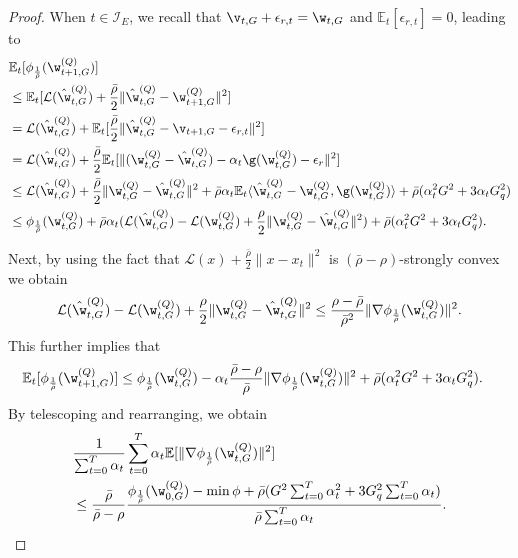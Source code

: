 \documentclass[a4paper,11pt]{article}
\begin{document}
\begin{proof}
When $t \in \mathcal{I}_E$, we recall that $\v_{t, G} + \epsilon_{r, t} = \w_{t, G} $ and $\mathbb{E}_t[\epsilon_{r, t}] = 0$, leading to
\begin{align*}
    & \mathbb{E}_t [\phi_{\frac{1}{\bar{\rho}}}(\w^{(Q)}_{t+1, G})]\\
    & \leq \mathbb{E}_t [\mathcal{L}(\hat{\w}^{(Q)}_{t, G}) + \frac{\bar{\rho}}{2}\|\hat{\w }^{(Q)}_{t, G} - \w^{(Q)}_{t+1, G} \|^2  ] \\
    & = \mathcal{L}(\hat{\w }^{(Q)}_{t, G}) + \mathbb{E}_t[ \frac{\bar{\rho}}{2}\|\hat{\w}^{(Q)}_{t, G} - \v_{t+1, G} - \epsilon_{r, t} \|^2 ] \\
    & = \mathcal{L}(\hat{\w }^{(Q)}_{t, G}) + \frac{\bar{\rho}}{2}\mathbb{E}_t [\| (\w^{(Q)}_{t, G} - \hat{\w }^{(Q)}_{t, G}) -  \alpha_{t} \g(\w^{(Q)}_{t, G}) - \epsilon_{r} \|^2 ] \\
    & \leq \mathcal{L}(\hat{\w}^{(Q)}_{t, G}) + \frac{\bar{\rho}}{2} \| \w^{(Q)}_{t, G} - \hat{\w }^{(Q)}_{t, G}\|^2 + \bar{\rho} \alpha_t \mathbb{E}_t\langle \hat{\w }^{(Q)}_{t, G} - \w^{(Q)}_{t, G}, \g(\w^{(Q)}_{t, G}) \rangle + \bar{\rho}(\alpha_t^2G^2+3\alpha_t G_q^2) \\
    & \leq  \phi_{\frac{1}{\bar{\rho}}}(\w^{(Q)}_{t, G}) + \bar{\rho}\alpha_t (\mathcal{L}(\hat{\w}^{(Q)}_{t, G} ) - \mathcal{L}(\w^{(Q)}_{t, G}) + \frac{\rho}{2} \|\w^{(Q)}_{t, G} - \hat{\w }^{(Q)}_{t, G} \|^2 ) + \bar{\rho}(\alpha_t^2G^2+3\alpha_t G_q^2).
\end{align*}

Next, by using the fact that $\mathcal{L}(x) + \frac{\bar{\rho}}{2} \|x - x_t \|^2$ is $(\bar{\rho} - \rho)$-strongly convex we obtain 
\begin{align*}
    \mathcal{L}(\hat{\w}^{(Q)}_{t, G} ) - \mathcal{L}(\w^{(Q)}_{t, G}) + \frac{\rho}{2} \|\w^{(Q)}_{t, G} - \hat{\w }^{(Q)}_{t, G} \|^2 \leq \frac{\rho - \bar{\rho}}{\bar{\rho}^2} \|\nabla \phi_{\frac{1}{\bar{\rho}}} (\w^{(Q)}_{t, G}) \|^2.
\end{align*}
This further implies that
\begin{align*}
    \mathbb{E}_t [\phi_{\frac{1}{\bar{\rho}}}(\w^{(Q)}_{t+1, G})] & \leq  \phi_{\frac{1}{\bar{\rho}}}(\w^{(Q)}_{t, G}) - \alpha_t \frac{\bar{\rho} - \rho}{\bar{\rho}} \|\nabla \phi_{\frac{1}{\bar{\rho}}} (\w^{(Q)}_{t, G}) \|^2 + \bar{\rho}(\alpha_t^2G^2+3\alpha_t G_q^2).
\end{align*}
By telescoping and rearranging, we obtain
\begin{align*}
    & \frac{1}{\sum_{t=0}^T \alpha_{t}} \sum_{t=0}^T \alpha_{t} \mathbb{E} [ \|\nabla \phi_{\frac{1}{\bar{\rho}}} (\w^{(Q)}_{t, G}) \|^2 ] \\
    & \leq \frac{ \bar{\rho}}{\bar{\rho} - \rho} \frac{ \phi_{\frac{1}{\bar{\rho}}}(\w^{(Q)}_{0, G}) - \min \phi +  \bar{\rho}(G^2\sum_{t=0}^T \alpha^2_{t}+3G_q^2\sum_{t=0}^T \alpha_{t})}{\bar{\rho}\sum_{t=0}^T \alpha_{t}}.
\end{align*}


\end{proof}
\end{document}
